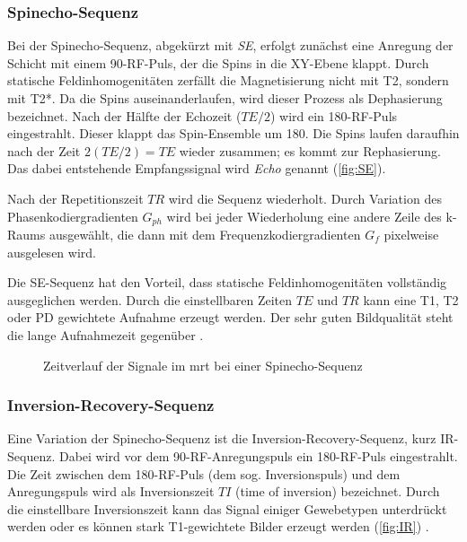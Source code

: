 \subsubsection{Spinecho-Sequenz}
\label{sec:SE}
Bei der Spinecho-Sequenz, abgekürzt mit \textit{SE}, erfolgt zunächst eine Anregung der Schicht mit einem 90\degree-RF-Puls, der die Spins in die XY-Ebene klappt. Durch statische Feldinhomogenitäten zerfällt die Magnetisierung nicht mit T2, sondern mit T2*. Da die Spins auseinanderlaufen, wird dieser Prozess als Dephasierung bezeichnet. Nach der Hälfte der Echozeit ($TE/2$) wird ein 180\degree-RF-Puls eingestrahlt. Dieser klappt das Spin-Ensemble um 180\degree. Die Spins laufen daraufhin nach der Zeit $2(TE/2) = TE$ wieder zusammen; es kommt zur Rephasierung. Das dabei entstehende Empfangssignal wird \textit{Echo} genannt (\autoref{fig:SE}).

Nach der Repetitionszeit $TR$ wird die Sequenz wiederholt. Durch Variation des Phasenkodiergradienten $G_{ph}$ wird bei jeder Wiederholung eine andere Zeile des k-Raums ausgewählt, die dann mit dem Frequenzkodiergradienten $G_f$ pixelweise ausgelesen wird.

Die SE-Sequenz hat den Vorteil, dass statische Feldinhomogenitäten vollständig ausgeglichen werden. Durch die einstellbaren Zeiten $TE$ und $TR$ kann eine T1, T2 oder PD gewichtete Aufnahme erzeugt werden.
Der sehr guten Bildqualität steht die lange Aufnahmezeit gegenüber \cite[S.~257]{Bushong2014}.

\begin{figure}[H]
	\centering
	\caption[Spinecho-Sequenz]{Zeitverlauf der Signale im \gls{mrt} bei einer Spinecho-Sequenz}
	\label{fig:SE}
\end{figure}

\subsubsection{Inversion-Recovery-Sequenz}
\label{sec:IR}
Eine Variation der Spinecho-Sequenz ist die Inversion-Recovery-Sequenz, kurz IR-Sequenz. Dabei wird vor dem 90\degree-RF-Anregungspuls ein 180\degree-RF-Puls eingestrahlt. Die Zeit zwischen dem 180\degree-RF-Puls (dem sog. Inversionspuls) und dem Anregungspuls wird als Inversionszeit $TI$ (time of inversion) bezeichnet. Durch die einstellbare Inversionszeit kann das Signal einiger Gewebetypen unterdrückt werden oder es können stark T1-gewichtete Bilder erzeugt werden (\autoref{fig:IR}) \cite[S.~244]{Bushong2014}.

